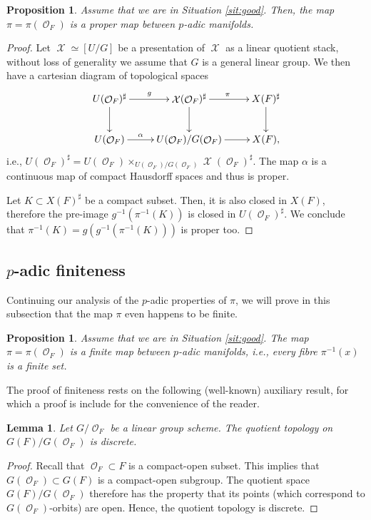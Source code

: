 \documentclass{article}
\DeclareMathOperator{\Xc}{\mathcal{X}}
\DeclareMathOperator{\Oc}{\mathcal{O}}
\theoremstyle{definition}
\theoremstyle{plain}
\newtheorem{proposition}[definition]{Proposition}
\newtheorem{lemma}[definition]{Lemma}
\begin{document}
\begin{proposition}\label{prop:proper}
Assume that we are in Situation \ref{sit:good}. Then, the map $\pi = \pi(\Oc_F)$ is a proper map between $p$-adic manifolds.    
\end{proposition}
\begin{proof}
 Let $\Xc \simeq [U/G]$ be a presentation of $\Xc$ as a linear quotient stack, without loss of generality we assume that $G$ is a general linear group. We then have a cartesian diagram of topological spaces
 \[
\xymatrix{
U(\Oc_F)^{\sharp} \ar[d] \ar[r]^g & \Xc(\Oc_F)^{\sharp} \ar[d] \ar[r]^{\pi} & X(F)^{\sharp} \ar[d]  \\
U(\Oc_F) \ar[r]^-{\alpha} & U(\Oc_F)/G(\Oc_F) \ar[r] & X(F),
}
 \]
i.e., $U(\Oc_F)^{\sharp} = U(\Oc_F) \times_{U(\Oc_F)/G(\Oc_F)} \Xc(\Oc_F)^{\sharp}$. The map $\alpha$ is a continuous map of compact Hausdorff spaces and thus is proper. 

Let $K \subset X(F)^{\sharp}$ be a compact subset. Then, it is also closed in $X(F)$, therefore the pre-image $g^{-1}(\pi^{-1}(K))$ is closed in $U(\Oc_F)^{\sharp}$.  We conclude that $\pi^{-1}(K)=g(g^{-1}(\pi^{-1}(K)))$ is proper too.
\end{proof}

\subsection{$p$-adic finiteness}

Continuing our analysis of the $p$-adic properties of $\pi$, we will prove in this subsection that the map $\pi$ even happens to be finite.

\begin{proposition}\label{prop:finite}
Assume that we are in Situation \ref{sit:good}. The map $\pi=\pi(\Oc_F)$ is a finite map between $p$-adic manifolds, i.e., every fibre $\pi^{-1}(x)$ is a finite set.
\end{proposition}

The proof of finiteness rests on the following (well-known) auxiliary result, for which a proof is include for the convenience of the reader.

\begin{lemma}\label{lemma:discrete}
Let $G/\Oc_F$ be a linear group scheme. The quotient topology on $G(F)/G(\Oc_F)$ is discrete.
\end{lemma}
\begin{proof}
 Recall that $\Oc_F \subset F$ is a compact-open subset. This implies that $G(\Oc_F)\subset G(F)$ is a compact-open subgroup. The quotient space $G(F)/G(\Oc_F)$ therefore has the property that its points (which correspond to $G(\Oc_F)$-orbits) are open. Hence, the quotient topology is discrete.    
\end{proof}
\end{document}
